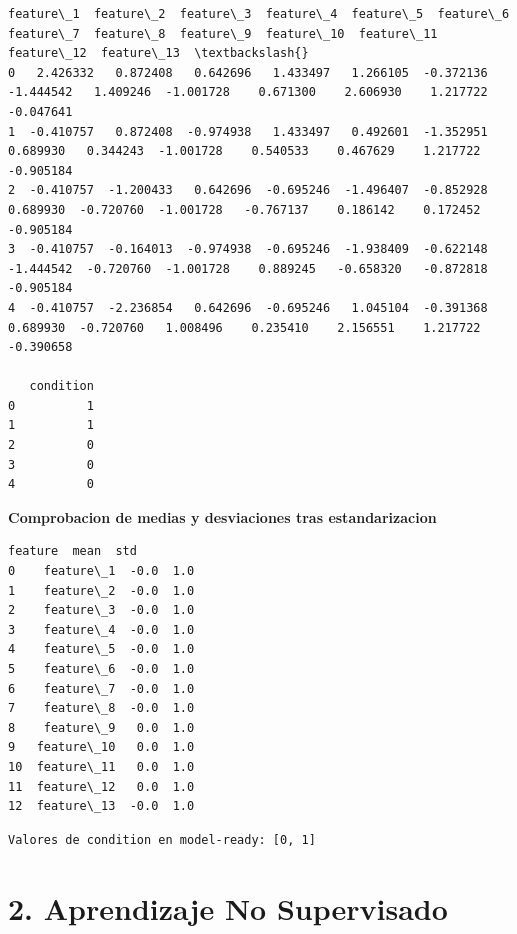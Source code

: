 \documentclass[11pt]{article}
\begin{document}
    
    
    \begin{Verbatim}[commandchars=\\\{\}]
   feature\_1  feature\_2  feature\_3  feature\_4  feature\_5  feature\_6  feature\_7  feature\_8  feature\_9  feature\_10  feature\_11  feature\_12  feature\_13  \textbackslash{}
0   2.426332   0.872408   0.642696   1.433497   1.266105  -0.372136  -1.444542   1.409246  -1.001728    0.671300    2.606930    1.217722   -0.047641   
1  -0.410757   0.872408  -0.974938   1.433497   0.492601  -1.352951   0.689930   0.344243  -1.001728    0.540533    0.467629    1.217722   -0.905184   
2  -0.410757  -1.200433   0.642696  -0.695246  -1.496407  -0.852928   0.689930  -0.720760  -1.001728   -0.767137    0.186142    0.172452   -0.905184   
3  -0.410757  -0.164013  -0.974938  -0.695246  -1.938409  -0.622148  -1.444542  -0.720760  -1.001728    0.889245   -0.658320   -0.872818   -0.905184   
4  -0.410757  -2.236854   0.642696  -0.695246   1.045104  -0.391368   0.689930  -0.720760   1.008496    0.235410    2.156551    1.217722   -0.390658   

   condition  
0          1  
1          1  
2          0  
3          0  
4          0  
    \end{Verbatim}

    
    \textbf{Comprobacion de medias y desviaciones tras estandarizacion}

    
    
    \begin{Verbatim}[commandchars=\\\{\}]
       feature  mean  std
0    feature\_1  -0.0  1.0
1    feature\_2  -0.0  1.0
2    feature\_3  -0.0  1.0
3    feature\_4  -0.0  1.0
4    feature\_5  -0.0  1.0
5    feature\_6  -0.0  1.0
6    feature\_7  -0.0  1.0
7    feature\_8  -0.0  1.0
8    feature\_9   0.0  1.0
9   feature\_10   0.0  1.0
10  feature\_11   0.0  1.0
11  feature\_12   0.0  1.0
12  feature\_13  -0.0  1.0
    \end{Verbatim}

    
    \begin{Verbatim}[commandchars=\\\{\}]
Valores de condition en model-ready: [0, 1]
    \end{Verbatim}

    \section{2. Aprendizaje No
Supervisado}\label{aprendizaje-no-supervisado}
\end{document}

